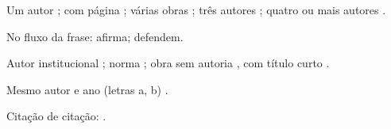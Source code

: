 \documentclass[12pt, a4paper, brazilian]{abntex2}
\begin{document}
\noindent Um autor \cite{ex-livro}; com página \cite[p.~35]{ex-livro};
várias obras \cite{ex-livro,ex-artigo}; três autores \cite{ex-livro-3};
quatro ou mais autores \cite{ex-livro-4}.

\noindent No fluxo da frase: \textcite{ex-livro} afirma;
\textcite[p.~35]{ex-livro-3} defendem.

\noindent Autor institucional \cite{ex-entidade}; norma \cite{ex-norma};
obra sem autoria \cite{ex-sem-autor}, com título curto
\cite{ex-sem-autor-artigo}.

\noindent Mesmo autor e ano (letras a, b) \cite{ex-reeside-a,ex-reeside-b}.

\noindent Citação de citação: .

\printbibliography
\end{document}
